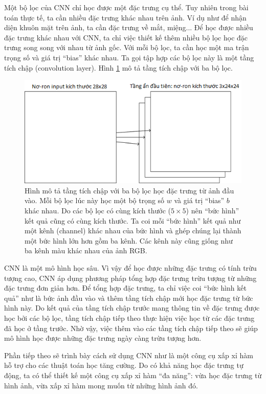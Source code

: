 	Một bộ lọc của CNN chỉ học được một đặc trưng cụ thể.
	Tuy nhiên trong bài toán thực tế, ta cần nhiều đặc trưng khác nhau trên ảnh.
	Ví dụ như để nhận diện khuôn mặt trên ảnh, ta cần đặc trưng về mắt, miệng...
	Để học được nhiều đặc trưng khác nhau với CNN, ta chỉ việc thiết kế thêm nhiều bộ lọc học đặc trưng song song với nhau từ ảnh gốc.
	Với mỗi bộ lọc, ta cần học một ma trận trọng số và giá trị ``bias'' khác nhau.
	Ta gọi tập hợp các bộ lọc này là một tầng tích chập (convolution layer).
	Hình \ref{fig_cnn_layer} mô tả tầng tích chập với ba bộ lọc.
	\begin{figure}
		\centering
		\includegraphics[width=.8\textwidth]{cnn_layer}
		\caption[Tầng tích chập với ba bộ lọc]{Hình mô tả tầng tích chập với ba bộ lọc học đặc trưng từ ảnh đầu vào.
		Mỗi bộ lọc lúc này học một bộ trọng số $w$ và giá trị ``bias'' $b$ khác nhau.
		Do các bộ lọc có cùng kích thước ($5\times5$) nên ``bức hình'' kết quả cũng có cùng kích thước.
		Ta coi mỗi ``bức hình'' kết quả như một kênh (channel) khác nhau của bức hình và ghép chúng lại thành một bức hình lớn hơn gồm ba kênh.
		Các kênh này cũng giống như ba kênh màu khác nhau của ảnh RGB.}
		\label{fig_cnn_layer}
	\end{figure}
	
	CNN là một mô hình học sâu.
	Vì vậy để học được những đặc trưng có tính trừu tượng cao, CNN áp dụng phương pháp tổng hợp đặc trưng trừu tượng từ những đặc trưng đơn giản hơn.
	Để tổng hợp đặc trưng, ta chỉ việc coi ``bức hình kết quả'' như là bức ảnh đầu vào và thêm tầng tích chập mới học đặc trưng từ bức hình này.
	Do kết quả của tầng tích chập trước mang thông tin về đặc trưng được học bởi các bộ lọc, tầng tích chập tiếp theo thực hiện việc học từ các đặc trưng đã học ở tầng trước.
	Nhờ vậy, việc thêm vào các tầng tích chập tiếp theo sẽ giúp mô hình học được những đặc trưng ngày càng trừu tượng hơn.
	
	Phần tiếp theo sẽ trình bày cách sử dụng CNN như là một công cụ xấp xỉ hàm hỗ trợ cho các thuật toán học tăng cường.
	Do có khả năng học đặc trưng tự động, ta có thể thiết kế một công cụ xấp xỉ hàm ``đa năng'': vừa học đặc trưng từ hình ảnh, vừa xấp xỉ hàm mong muốn từ những hình ảnh đó.

